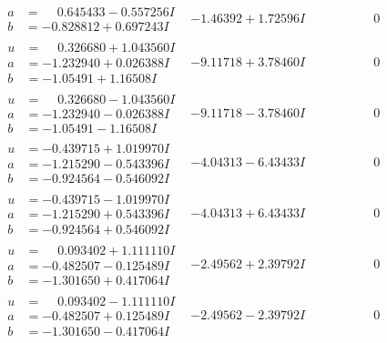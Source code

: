 \documentclass[1p]{elsarticle_modified}
\theoremstyle{definition}
\begin{document}
$$\begin{array}{c|c|c}
\begin{aligned}
a &= \phantom{-}0.645433 - 0.557256 I \\
b &= -0.828812 + 0.697243 I\end{aligned}
 & -1.46392 + 1.72596 I & \phantom{-0.000000 } 0 \\ \hline\begin{aligned}
u &= \phantom{-}0.326680 + 1.043560 I \\
a &= -1.232940 + 0.026388 I \\
b &= -1.05491 + 1.16508 I\end{aligned}
 & -9.11718 + 3.78460 I & \phantom{-0.000000 } 0 \\ \hline\begin{aligned}
u &= \phantom{-}0.326680 - 1.043560 I \\
a &= -1.232940 - 0.026388 I \\
b &= -1.05491 - 1.16508 I\end{aligned}
 & -9.11718 - 3.78460 I & \phantom{-0.000000 } 0 \\ \hline\begin{aligned}
u &= -0.439715 + 1.019970 I \\
a &= -1.215290 - 0.543396 I \\
b &= -0.924564 - 0.546092 I\end{aligned}
 & -4.04313 - 6.43433 I & \phantom{-0.000000 } 0 \\ \hline\begin{aligned}
u &= -0.439715 - 1.019970 I \\
a &= -1.215290 + 0.543396 I \\
b &= -0.924564 + 0.546092 I\end{aligned}
 & -4.04313 + 6.43433 I & \phantom{-0.000000 } 0 \\ \hline\begin{aligned}
u &= \phantom{-}0.093402 + 1.111110 I \\
a &= -0.482507 - 0.125489 I \\
b &= -1.301650 + 0.417064 I\end{aligned}
 & -2.49562 + 2.39792 I & \phantom{-0.000000 } 0 \\ \hline\begin{aligned}
u &= \phantom{-}0.093402 - 1.111110 I \\
a &= -0.482507 + 0.125489 I \\
b &= -1.301650 - 0.417064 I\end{aligned}
 & -2.49562 - 2.39792 I & \phantom{-0.000000 } 0 \\ \hline\begin{aligned}

\end{aligned}
\end{array}$$
\end{document}

